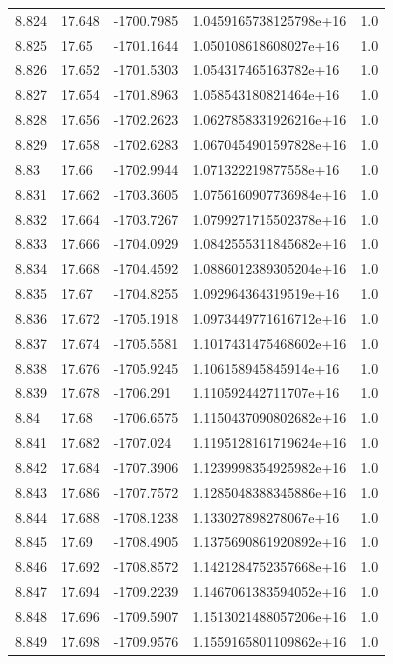 \begin{tabular}{lllll}
8.824 & 17.648 & -1700.7985 & 1.0459165738125798e+16 & 1.0 \\
8.825 & 17.65 & -1701.1644 & 1.050108618608027e+16 & 1.0 \\
8.826 & 17.652 & -1701.5303 & 1.054317465163782e+16 & 1.0 \\
8.827 & 17.654 & -1701.8963 & 1.058543180821464e+16 & 1.0 \\
8.828 & 17.656 & -1702.2623 & 1.0627858331926216e+16 & 1.0 \\
8.829 & 17.658 & -1702.6283 & 1.0670454901597828e+16 & 1.0 \\
8.83 & 17.66 & -1702.9944 & 1.071322219877558e+16 & 1.0 \\
8.831 & 17.662 & -1703.3605 & 1.0756160907736984e+16 & 1.0 \\
8.832 & 17.664 & -1703.7267 & 1.0799271715502378e+16 & 1.0 \\
8.833 & 17.666 & -1704.0929 & 1.0842555311845682e+16 & 1.0 \\
8.834 & 17.668 & -1704.4592 & 1.0886012389305204e+16 & 1.0 \\
8.835 & 17.67 & -1704.8255 & 1.092964364319519e+16 & 1.0 \\
8.836 & 17.672 & -1705.1918 & 1.0973449771616712e+16 & 1.0 \\
8.837 & 17.674 & -1705.5581 & 1.1017431475468602e+16 & 1.0 \\
8.838 & 17.676 & -1705.9245 & 1.106158945845914e+16 & 1.0 \\
8.839 & 17.678 & -1706.291 & 1.110592442711707e+16 & 1.0 \\
8.84 & 17.68 & -1706.6575 & 1.1150437090802682e+16 & 1.0 \\
8.841 & 17.682 & -1707.024 & 1.1195128161719624e+16 & 1.0 \\
8.842 & 17.684 & -1707.3906 & 1.1239998354925982e+16 & 1.0 \\
8.843 & 17.686 & -1707.7572 & 1.1285048388345886e+16 & 1.0 \\
8.844 & 17.688 & -1708.1238 & 1.133027898278067e+16 & 1.0 \\
8.845 & 17.69 & -1708.4905 & 1.1375690861920892e+16 & 1.0 \\
8.846 & 17.692 & -1708.8572 & 1.1421284752357668e+16 & 1.0 \\
8.847 & 17.694 & -1709.2239 & 1.1467061383594052e+16 & 1.0 \\
8.848 & 17.696 & -1709.5907 & 1.1513021488057206e+16 & 1.0 \\
8.849 & 17.698 & -1709.9576 & 1.1559165801109862e+16 & 1.0 \\

\end{tabular}
